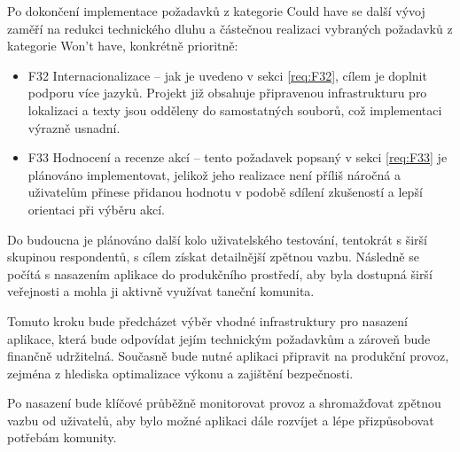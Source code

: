 Po dokončení implementace požadavků z kategorie Could have se další vývoj zaměří na redukci technického dluhu a částečnou realizaci vybraných požadavků z kategorie Won’t have, konkrétně prioritně:
\begin{itemize}
\item F32 Internacionalizace – jak je uvedeno v sekci \ref{req:F32}, cílem je doplnit podporu více jazyků. Projekt již obsahuje připravenou infrastrukturu pro lokalizaci a texty jsou odděleny do samostatných souborů, což implementaci výrazně usnadní.
\item F33 Hodnocení a recenze akcí – tento požadavek popsaný v sekci \ref{req:F33} je plánováno implementovat, jelikož jeho realizace není příliš náročná a uživatelům přinese přidanou hodnotu v podobě sdílení zkušeností a lepší orientaci při výběru akcí.
\end{itemize}

Do budoucna je plánováno další kolo uživatelského testování, tentokrát s širší skupinou respondentů, s cílem získat detailnější zpětnou vazbu. Následně se počítá s nasazením aplikace do produkčního prostředí, aby byla dostupná širší veřejnosti a mohla ji aktivně využívat taneční komunita.

Tomuto kroku bude předcházet výběr vhodné infrastruktury pro nasazení aplikace, která bude odpovídat jejím technickým požadavkům a zároveň bude finančně udržitelná. Současně bude nutné aplikaci připravit na produkční provoz, zejména z hlediska optimalizace výkonu a zajištění bezpečnosti.

Po nasazení bude klíčové průběžně monitorovat provoz a shromažďovat zpětnou vazbu od uživatelů, aby bylo možné aplikaci dále rozvíjet a lépe přizpůsobovat potřebám komunity.